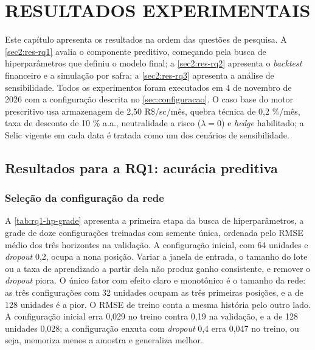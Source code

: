 \chapter{\MakeUppercase{Resultados Experimentais}}\label{sec:resultados}

Este capítulo apresenta os resultados na ordem das questões de pesquisa. A \autoref{sec2:res-rq1} avalia o componente preditivo, começando pela busca de hiperparâmetros que definiu o modelo final; a \autoref{sec2:res-rq2} apresenta o \textit{backtest} financeiro e a simulação por safra; a \autoref{sec2:res-rq3} apresenta a análise de sensibilidade. Todos os experimentos foram executados em 4 de novembro de 2026 com a configuração descrita no \autoref{sec:configuracao}. O caso base do motor prescritivo usa armazenagem de 2,50 R\$/sc/mês, quebra técnica de 0,2 \%/mês, taxa de desconto de 10 \% a.a., neutralidade a risco ($\lambda = 0$) e \textit{hedge} habilitado; a Selic vigente em cada data é tratada como um dos cenários de sensibilidade.

\section{Resultados para a RQ1: acurácia preditiva}\label{sec2:res-rq1}

\subsection{Seleção da configuração da rede}\label{sec2:res-hp}

A \autoref{tab:rq1-hp-grade} apresenta a primeira etapa da busca de hiperparâmetros, a grade de doze configurações treinadas com semente única, ordenada pelo RMSE médio dos três horizontes na validação. A configuração inicial, com 64 unidades e \textit{dropout} 0,2, ocupa a nona posição. Variar a janela de entrada, o tamanho do lote ou a taxa de aprendizado a partir dela não produz ganho consistente, e remover o \textit{dropout} piora. O único fator com efeito claro e monotônico é o tamanho da rede: as três configurações com 32 unidades ocupam as três primeiras posições, e a de 128 unidades é a pior. O RMSE de treino conta a mesma história pelo outro lado. A configuração inicial erra 0,029 no treino contra 0,19 na validação, e a de 128 unidades 0,028; a configuração enxuta com \textit{dropout} 0,4 erra 0,047 no treino, ou seja, memoriza menos a amostra e generaliza melhor.

